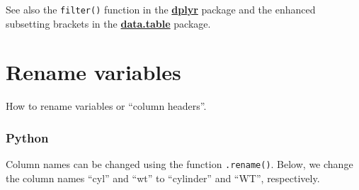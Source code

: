 \documentclass[
]{book}
\begin{document}
See also the \texttt{filter()} function in the \href{https://dplyr.tidyverse.org/}{\textbf{dplyr}} package and the enhanced subsetting brackets in the \href{https://rdatatable.gitlab.io/data.table/}{\textbf{data.table}} package.

\hypertarget{rename-variables}{%
\section{Rename variables}\label{rename-variables}}

How to rename variables or ``column headers''.

\hypertarget{python-20}{%
\subsubsection*{Python}\label{python-20}}

Column names can be changed using the function \texttt{.rename()}. Below, we change the column names ``cyl'' and ``wt'' to ``cylinder'' and ``WT'', respectively.
\end{document}
